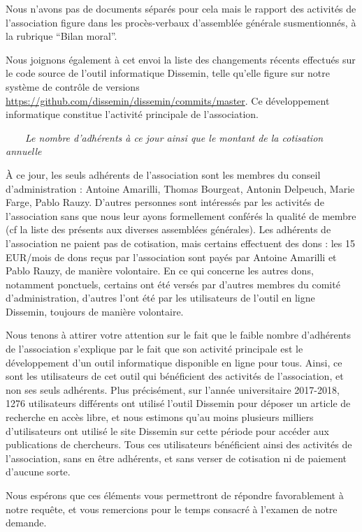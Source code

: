 \documentclass[11pt]{lettre}
\begin{document}
\begin{letter}
Nous n'avons pas de documents séparés pour cela mais le rapport des activités de l'association figure dans les procès-verbaux d'assemblée générale susmentionnés, à la rubrique ``Bilan moral''.

Nous joignons également à cet envoi la liste des changements récents effectués sur le code source de l'outil informatique Dissemin, telle qu'elle figure sur notre système de contrôle de versions \url{https://github.com/dissemin/dissemin/commits/master}. Ce développement informatique constitue l'activité principale de l'association.

    ~~~~\emph{Le nombre d'adhérents à ce jour ainsi que le montant de la cotisation annuelle}

À ce jour, les seuls adhérents de l'association sont les membres du conseil d'administration : Antoine Amarilli, Thomas Bourgeat, Antonin Delpeuch, Marie Farge, Pablo Rauzy. D'autres personnes sont intéressés par les activités de l'association sans que nous leur ayons formellement conférés la qualité de membre (cf la liste des présents aux diverses assemblées générales). Les adhérents de l'association ne paient pas de cotisation, mais certains effectuent des dons : les 15 EUR/mois de dons reçus par l'association sont payés par Antoine Amarilli et Pablo Rauzy, de manière volontaire. En ce qui concerne les autres dons, notamment ponctuels, certains ont été versés par d'autres membres du comité d'administration, d'autres l'ont été par les utilisateurs de l'outil en ligne Dissemin, toujours de manière volontaire.

Nous tenons à attirer votre attention sur le fait que le faible nombre d'adhérents de l'association s'explique par le fait que son activité principale est le développement d'un outil informatique disponible en ligne pour tous. Ainsi, ce sont les utilisateurs de cet outil qui bénéficient des activités de l'association, et non ses seuls adhérents. Plus précisément, sur l'année universitaire 2017-2018, 1276 utilisateurs différents ont utilisé l'outil Dissemin pour déposer un article de recherche en accès libre, et nous estimons qu'au moins plusieurs milliers d'utilisateurs ont utilisé le site Dissemin sur cette période pour accéder aux publications de chercheurs. Tous ces utilisateurs bénéficient ainsi des activités de l'association, sans en être adhérents, et sans verser de cotisation ni de paiement d'aucune sorte.

Nous espérons que ces éléments vous permettront de répondre favorablement à notre requête, et vous remercions pour le temps consacré à l'examen de notre demande.


\end{letter}
\end{document}
